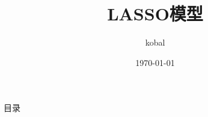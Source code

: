 \documentclass{beamer}
\title{LASSO模型}
\author{kobal}
\date{\today}
\begin{document}
\begin{frame}\transboxout
	\titlepage
\end{frame}
\begin{frame}{目录}
	\tableofcontents[hideallsubsections]
\end{frame}
\end{document}
